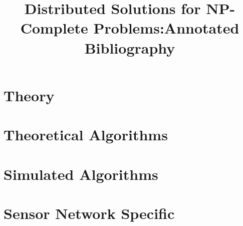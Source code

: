 

\bibliographyunit[\section]

\title{Distributed Solutions for NP-Complete Problems:Annotated Bibliography} 

\author{
}

\maketitle
\section{Theory}
\nocite{1011811}
\nocite{21723}
\nocite{mitchell06}
\putbib
\section{Theoretical Algorithms}
\nocite{1378540}
\nocite{Gonzalez1995129}
\nocite{1435381}
\nocite{Astrand:2009fk}
\nocite{1582746}
\nocite{254190}
\nocite{338269}
\nocite{1536432}
\nocite{1146387}
\putbib
\section{Simulated Algorithms}
\nocite{978-3-540-77220-0_36}
\nocite{IPDPS.2008.45361}
\nocite{1741522}
\nocite{1640702}
\putbib
\section{Sensor Network Specific}
\nocite{1346629}
\nocite{1525859}
\nocite{1464428}
\putbib
